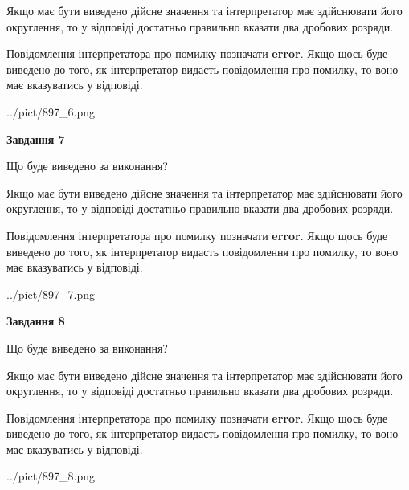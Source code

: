 \documentclass[12pt, ukrainian]{article}
\begin{document}
{\begin {Large}
Якщо має бути виведено дійсне значення та інтерпретатор має здійснювати його округлення, 
то у відповіді достатньо правильно вказати два дробових розряди.

Повідомлення інтерпретатора про помилку позначати \textbf{error}.
Якщо щось буде виведено до того, як інтерпретатор видасть повідомлення про помилку, 
то воно має вказуватись у відповіді. \par

\begin{center}
	{../pict/897_6.png}
\end{center}
\newpage

{\begin {center}\textbf{Завдання 7}\end {center}}\par
Що буде виведено за виконання? \par

Якщо має бути виведено дійсне значення та інтерпретатор має здійснювати його округлення, 
то у відповіді достатньо правильно вказати два дробових розряди.

Повідомлення інтерпретатора про помилку позначати \textbf{error}.
Якщо щось буде виведено до того, як інтерпретатор видасть повідомлення про помилку, 
то воно має вказуватись у відповіді. \par

\begin{center}
	{../pict/897_7.png}
\end{center}
\newpage

{\begin {center}\textbf{Завдання 8}\end {center}}\par
Що буде виведено за виконання? \par

Якщо має бути виведено дійсне значення та інтерпретатор має здійснювати його округлення, 
то у відповіді достатньо правильно вказати два дробових розряди.

Повідомлення інтерпретатора про помилку позначати \textbf{error}.
Якщо щось буде виведено до того, як інтерпретатор видасть повідомлення про помилку, 
то воно має вказуватись у відповіді. \par

\begin{center}
	{../pict/897_8.png}
\end{center}
\newpage


\end{Large}}
\end{document}
